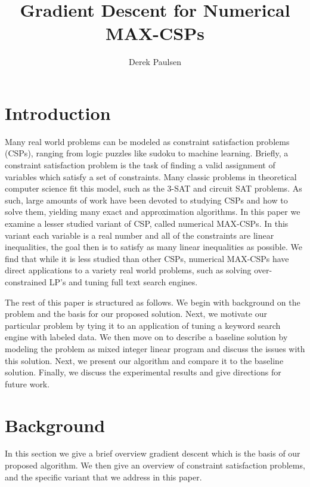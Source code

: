 \documentclass[a4paper]{article}
\title{Gradient Descent for Numerical MAX-CSPs} %
\author{
Derek Paulsen \\
}
\date{}
\begin{document}
\maketitle 


\section{Introduction}


Many real world problems can be modeled as constraint satisfaction problems (CSPs),
ranging from logic puzzles like sudoku to machine learning. Briefly, a
constraint satisfaction problem is the task of finding a valid assignment of
variables which satisfy a set of constraints. Many classic problems in
theoretical computer science fit this model, such as the 3-SAT and circuit SAT
problems. As such, large amounts of work have been
devoted to studying CSPs and how to solve them, yielding many exact and
approximation algorithms.  In this paper we examine a lesser studied variant of
CSP, called numerical MAX-CSPs. In this variant each variable is a real number
and all of the constraints are linear inequalities, the goal then is to satisfy
as many linear inequalities as possible. We find that while it is less
studied than other CSPs, numerical MAX-CSPs have direct applications to 
a variety real world problems, such as solving over-constrained LP's and 
tuning full text search engines.

The rest of this paper is structured as follows. We begin with background
on the problem and the basis for our proposed solution. Next, we motivate our particular
problem by tying it to an application of tuning a keyword search engine with labeled data. We
then move on to describe a baseline solution by modeling the problem as mixed
integer linear program and discuss the issues with this solution. Next, we
present our algorithm and compare it to the baseline solution. Finally, we
discuss the experimental results and give directions for future work.

\section{Background}

In this section we give a brief overview gradient descent which
is the basis of our proposed algorithm. We then give
an overview of constraint satisfaction problems,
and the specific variant that we address in this paper.
\end{document}
